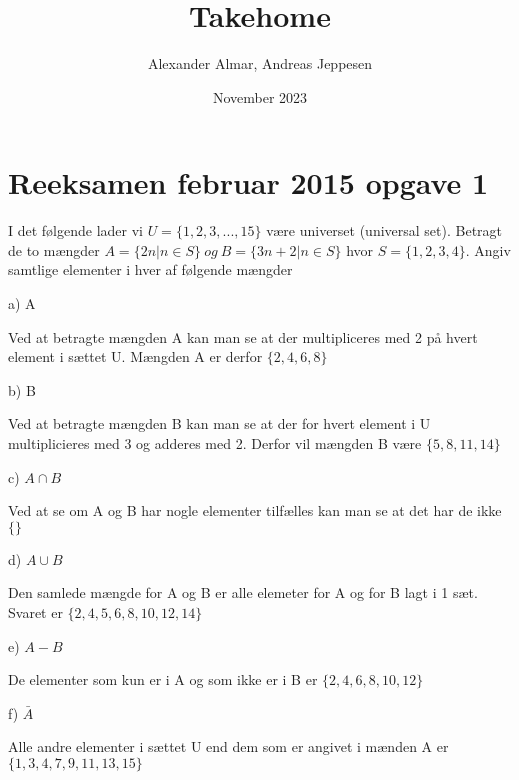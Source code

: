 \documentclass{article}
\title{Takehome}
\author{Alexander Almar, Andreas Jeppesen }
\date{November 2023}
\begin{document}
\maketitle

\section{Reeksamen februar 2015 opgave 1}
I det følgende lader vi \(U = \{1, 2, 3, . . . , 15\}\) være universet (universal set). Betragt de to mængder 
\(A = \{2n | n \in S\}\ og\ B = \{3n + 2 | n \in S\}\) hvor \(S = \{1, 2, 3, 4\}\). Angiv samtlige elementer i hver af følgende mængder

a) A

Ved at betragte mængden A kan man se at der multipliceres med 2 på hvert element i sættet U. Mængden A er derfor
\(\{2,4,6,8\}\)

b) B

Ved at betragte mængden B kan man se at der for hvert element i U multiplicieres med 3 og adderes med 2. Derfor vil mængden B være 
\(\{5,8,11,14\}\)

c) \(A \cap B\)

Ved at se om A og B har nogle elementer tilfælles kan man se at det har de ikke 
\(\{\}\)

d) \(A \cup B\)

Den samlede mængde for A og B er alle elemeter for A og for B lagt i 1 sæt. Svaret er 
\(\{2,4,5,6,8,10,12,14\}\)

e) \(A-B\)

De elementer som kun er i A og som ikke er i B er
\(\{2,4,6,8,10,12\}\)

f) \(\bar A \)

Alle andre elementer i sættet U end dem som er angivet i mænden A er 
\(\{1,3,4,7,9,11,13,15\}\)
\end{document}
